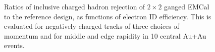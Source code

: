 \begin{figure}[hbt]
  \centering

  \caption{ Ratios of inclusive charged hadron rejection of $2\times2$ ganged
 EMCal to the reference design, as functions of electron ID
 efficiency. This is evaluated for negatively charged tracks of three
 choices of momentum and for middle and edge rapidity in 10%
 central Au+Au events.}
\label{fig:eid_ratios_auau}
\end{figure}
